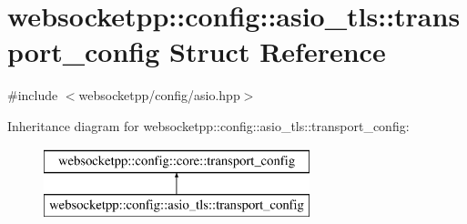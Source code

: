 \hypertarget{structwebsocketpp_1_1config_1_1asio__tls_1_1transport__config}{}\section{websocketpp\+:\+:config\+:\+:asio\+\_\+tls\+:\+:transport\+\_\+config Struct Reference}
\label{structwebsocketpp_1_1config_1_1asio__tls_1_1transport__config}


{\ttfamily \#include $<$websocketpp/config/asio.\+hpp$>$}

Inheritance diagram for websocketpp\+:\+:config\+:\+:asio\+\_\+tls\+:\+:transport\+\_\+config\+:\begin{figure}[H]
\begin{center}
\leavevmode
\includegraphics[height=2.000000cm]{structwebsocketpp_1_1config_1_1asio__tls_1_1transport__config}
\end{center}
\end{figure}
